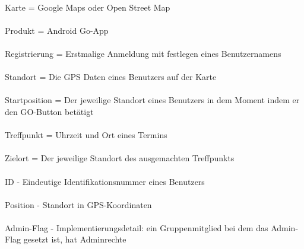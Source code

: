 \\
Karte = Google Maps oder Open Street Map\\
\\
Produkt = Android Go-App\\
\\
Registrierung = Erstmalige Anmeldung mit festlegen eines Benutzernamens\\
\\
Standort = Die GPS Daten eines Benutzers auf der Karte\\
\\
Startposition = Der jeweilige Standort eines Benutzers in dem Moment indem er den GO-Button betätigt\\
\\
Treffpunkt = Uhrzeit und Ort eines Termins\\
\\
Zielort = Der jeweilige Standort des ausgemachten Treffpunkts\\
\\
ID - Eindeutige Identifikationsnummer eines Benutzers\\
\\
Position - Standort in GPS-Koordinaten\\
\\
Admin-Flag - Implementierungsdetail: ein Gruppenmitglied bei dem das Admin-Flag gesetzt ist, hat Adminrechte\\
\\

